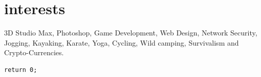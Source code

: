 \documentclass[]{friggeri-cv}
\begin{document}
\section{interests}
    3D Studio Max, Photoshop, Game Development, Web Design, Network Security, Jogging, Kayaking, Karate, Yoga, Cycling, Wild camping, Survivalism and Crypto-Currencies.


%
%


\begin{lstlisting}
return 0;
\end{lstlisting}
\end{document}
